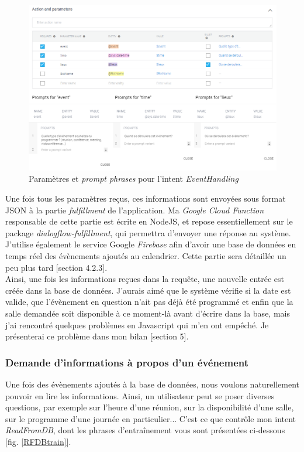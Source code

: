 \documentclass[stage2a]{tnreport} %
\begin{document}
\begin{figure}[h!]
    \centering
    \includegraphics[width=\textwidth]{figures/EHparameters.png}
    \caption{Paramètres et \emph{prompt phrases} pour l'intent \emph{EventHandling}}
    \label{prompt}
\end{figure}

Une fois tous les paramètres reçus, ces informations sont envoyées sous format JSON à la partie \emph{fulfillment} de l'application. Ma \emph{Google Cloud Function} responsable de cette partie est écrite en NodeJS, et repose essentiellement sur le package \emph{dialogflow-fulfillment}, qui permettra d'envoyer une réponse au système. J'utilise également le service Google \emph{Firebase} afin d'avoir une base de données en temps réel des évènements ajoutés au calendrier. Cette partie sera détaillée un peu plus tard [section 4.2.3].\\

Ainsi, une fois les informations reçues dans la requête, une nouvelle entrée est créée dans la base de données. J'aurais aimé que le système vérifie si la date est valide, que l'évènement en question n'ait pas déjà été programmé et enfin que la salle demandée soit disponible à ce moment-là avant d'écrire dans la base, mais j'ai rencontré quelques problèmes en Javascript qui m'en ont empêché. Je présenterai ce problème dans mon bilan [section 5]. \\

\subsubsection{Demande d'informations à propos d'un événement}

Une fois des évènements ajoutés à la base de données, nous voulons naturellement pouvoir en lire les informations. Ainsi, un utilisateur peut se poser diverses questions, par exemple sur l'heure d'une réunion, sur la disponibilité d'une salle, sur le programme d'une journée en particulier... C'est ce que contrôle mon intent \emph{ReadFromDB}, dont les phrases d'entraînement vous sont présentées ci-dessous [fig. \ref{RFDBtrain}].\\
\end{document}
